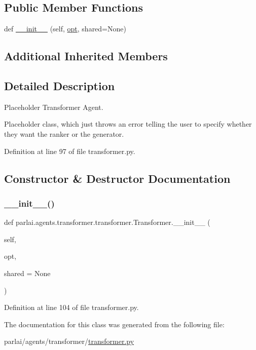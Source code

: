 \subsection*{Public Member Functions}
\begin{DoxyCompactItemize}
\item 
def \hyperlink{classparlai_1_1agents_1_1transformer_1_1transformer_1_1Transformer_ac71f8b1da727e5a62f56700fd87f3d60}{\+\_\+\+\_\+init\+\_\+\+\_\+} (self, \hyperlink{classparlai_1_1core_1_1agents_1_1Agent_ab3b45d2754244608c75d4068b90cd051}{opt}, shared=None)
\end{DoxyCompactItemize}
\subsection*{Additional Inherited Members}


\subsection{Detailed Description}
\begin{DoxyVerb}Placeholder Transformer Agent.

Placeholder class, which just throws an error telling the user to specify
whether they want the ranker or the generator.
\end{DoxyVerb}
 

Definition at line 97 of file transformer.\+py.



\subsection{Constructor \& Destructor Documentation}
\mbox{\label{classparlai_1_1agents_1_1transformer_1_1transformer_1_1Transformer_ac71f8b1da727e5a62f56700fd87f3d60}} 
\subsubsection{\texorpdfstring{\+\_\+\+\_\+init\+\_\+\+\_\+()}{\_\_init\_\_()}}
{\footnotesize\ttfamily def parlai.\+agents.\+transformer.\+transformer.\+Transformer.\+\_\+\+\_\+init\+\_\+\+\_\+ (\begin{DoxyParamCaption}\item[{}]{self,  }\item[{}]{opt,  }\item[{}]{shared = {\ttfamily None} }\end{DoxyParamCaption})}



Definition at line 104 of file transformer.\+py.



The documentation for this class was generated from the following file\+:\begin{DoxyCompactItemize}
\item 
parlai/agents/transformer/\hyperlink{transformer_8py}{transformer.\+py}\end{DoxyCompactItemize}
